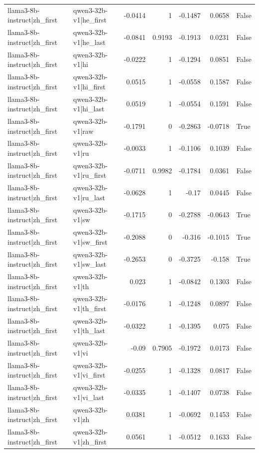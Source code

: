 \begin{table}
\begin{tabular}{l l r r r r l}
llama3-8b-instruct|zh_first & qwen3-32b-v1|he_first & -0.0414 & 1 & -0.1487 & 0.0658 & False \\
llama3-8b-instruct|zh_first & qwen3-32b-v1|he_last & -0.0841 & 0.9193 & -0.1913 & 0.0231 & False \\
llama3-8b-instruct|zh_first & qwen3-32b-v1|hi & -0.0222 & 1 & -0.1294 & 0.0851 & False \\
llama3-8b-instruct|zh_first & qwen3-32b-v1|hi_first & 0.0515 & 1 & -0.0558 & 0.1587 & False \\
llama3-8b-instruct|zh_first & qwen3-32b-v1|hi_last & 0.0519 & 1 & -0.0554 & 0.1591 & False \\
llama3-8b-instruct|zh_first & qwen3-32b-v1|raw & -0.1791 & 0 & -0.2863 & -0.0718 & True \\
llama3-8b-instruct|zh_first & qwen3-32b-v1|ru & -0.0033 & 1 & -0.1106 & 0.1039 & False \\
llama3-8b-instruct|zh_first & qwen3-32b-v1|ru_first & -0.0711 & 0.9982 & -0.1784 & 0.0361 & False \\
llama3-8b-instruct|zh_first & qwen3-32b-v1|ru_last & -0.0628 & 1 & -0.17 & 0.0445 & False \\
llama3-8b-instruct|zh_first & qwen3-32b-v1|sw & -0.1715 & 0 & -0.2788 & -0.0643 & True \\
llama3-8b-instruct|zh_first & qwen3-32b-v1|sw_first & -0.2088 & 0 & -0.316 & -0.1015 & True \\
llama3-8b-instruct|zh_first & qwen3-32b-v1|sw_last & -0.2653 & 0 & -0.3725 & -0.158 & True \\
llama3-8b-instruct|zh_first & qwen3-32b-v1|th & 0.023 & 1 & -0.0842 & 0.1303 & False \\
llama3-8b-instruct|zh_first & qwen3-32b-v1|th_first & -0.0176 & 1 & -0.1248 & 0.0897 & False \\
llama3-8b-instruct|zh_first & qwen3-32b-v1|th_last & -0.0322 & 1 & -0.1395 & 0.075 & False \\
llama3-8b-instruct|zh_first & qwen3-32b-v1|vi & -0.09 & 0.7905 & -0.1972 & 0.0173 & False \\
llama3-8b-instruct|zh_first & qwen3-32b-v1|vi_first & -0.0255 & 1 & -0.1328 & 0.0817 & False \\
llama3-8b-instruct|zh_first & qwen3-32b-v1|vi_last & -0.0335 & 1 & -0.1407 & 0.0738 & False \\
llama3-8b-instruct|zh_first & qwen3-32b-v1|zh & 0.0381 & 1 & -0.0692 & 0.1453 & False \\
llama3-8b-instruct|zh_first & qwen3-32b-v1|zh_first & 0.0561 & 1 & -0.0512 & 0.1633 & False \\

\end{tabular}
\end{table}
